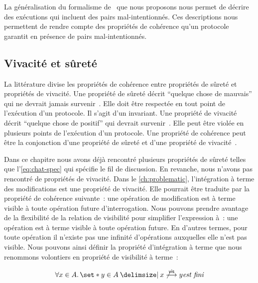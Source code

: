 La généralisation du formalisme de~\textcite{burckhardt_eventualconsistency_2014} que nous proposons nous permet de décrire des exécutions qui incluent des pairs mal-intentionnés.
Ces descriptions nous permettent de rendre compte des propriétés de cohérence qu'un protocole garantit en présence de pairs mal-intentionnés.



\subsection{Vivacité et sûreté}\label{subsec:consistency-spec-liveness-safety}

La littérature divise les propriétés de cohérence entre propriétés de sûreté et propriétés de vivacité.
Une propriété de sûreté décrit \enquote{quelque chose de mauvais} qui ne devrait jamais survenir~\autocite{lamport_1977_correctness}.
Elle doit être respectée en tout point de l'exécution d'un protocole.
Il s'agit d'un invariant.
Une propriété de vivacité décrit \enquote{quelque chose de positif} qui devrait survenir~\autocite{lamport_1977_correctness}.
Elle peut être violée en plusieurs points de l'exécution d'un protocole.
Une propriété de cohérence peut être la conjonction d'une propriété de sûreté et d'une propriété de vivacité~\autocite{alpern_liveness_1985}.

Dans ce chapitre nous avons déjà rencontré plusieurs propriétés de sûreté telles que l'\autoref{eq:chat-spec} qui spécifie le fil de discussion.
En revanche, nous n'avons pas rencontré de propriétés de vivacité.
Dans le \autoref{ch:problematic}, l'intégration à terme des modifications est une propriété de vivacité.
Elle pourrait être traduite par la propriété de cohérence suivante~: une opération de modification est à terme visible à toute opération future d'interrogation.
Nous pouvons prendre avantage de la flexibilité de la relation de visibilité pour simplifier l'expression à~: une opération est à terme visible à toute opération future.
En d'autres termes, pour toute opération il n'existe pas une infinité d'opérations auxquelles elle n'est pas visible.
Nous pouvons ainsi définir la propriété d'intégration à terme que nous renommons volontiers en propriété de visibilité à terme~:

\begin{equation}
    \forall x \in A \qsep \set*{y \in A \given x \not\vis y} \textit{est fini}
\end{equation}

